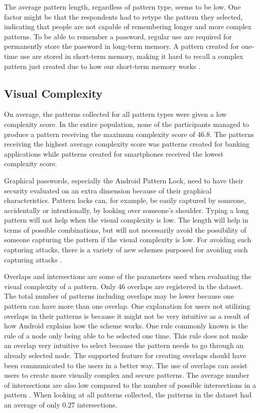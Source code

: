       The average pattern length, regardless of pattern type, seems to be low. One factor might be that the respondents had to retype the pattern they selected, indicating that people are not capable of remembering longer and more complex patterns. To be able to remember a password, regular use are required for permanently store the password in long-term memory. A pattern created for one-time use are stored in short-term memory, making it hard to recall a complex pattern just created due to how our short-term memory works \cite{DeAngeli}.

    \subsection{Visual Complexity}
      On average, the patterns collected for all pattern types were given a low complexity score. In the entire population, none of the participants managed to produce a pattern receiving the maximum complexity score of 46.8. The patterns receiving the highest average complexity score was patterns created for banking applications while patterns created for smartphones received the lowest complexity score. 

      Graphical passwords, especially the Android Pattern Lock, need to have their security evaluated on an extra dimension because of their graphical characteristics. Pattern locks can, for example, be easily captured by someone, accidentally or intentionally, by looking over someone's shoulder. Typing a long pattern will not help when the visual complexity is low. The length will help in terms of possible combinations, but will not necessarily avoid the possibility of someone capturing the pattern if the visual complexity is low.  For avoiding such capturing attacks, there is a variety of new schemes purposed for avoiding such capturing attacks \cite{Wiedenbeck, IPAS}. 

      Overlaps and intersections are some of the parameters used when evaluating the visual complexity of a pattern. Only 46 overlaps are registered in the dataset. The total number of patterns including overlaps may be lower because one pattern can have more than one overlap. One explanation for users not utilizing overlaps in their patterns is because it might not be very intuitive as a result of how Android explains how the scheme works. One rule commonly known is the rule of a node only being able to be selected one time. This rule does not make an overlap very intuitive to select because the pattern needs to go through an already selected node. The supported feature for creating overlaps should have been communicated to the users in a better way. The use of overlaps can assist users to create more visually complex and secure patterns. The average number of intersections are also low compared to the number of possible intersections in a pattern \cite{Sun}. When looking at all patterns collected, the patterns in the dataset had an average of only 0.27 intersections. 

